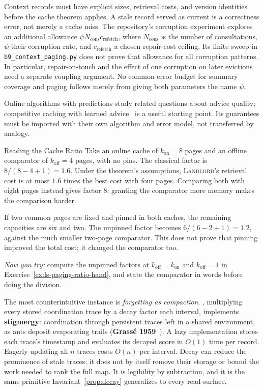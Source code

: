 \documentclass[11pt,a4paper]{article}
\theoremstyle{definition}
\theoremstyle{plain}
\begin{document}
\begin{pdboundary}
Context records must have explicit sizes, retrieval costs, and version identities before the cache theorem applies. A stale record served as current is a correctness error, not merely a cache miss. The repository's corruption experiment explores an additional allowance $\psi N_{\mathrm{cons}} c_{\mathrm{refetch}}$, where $N_{\mathrm{cons}}$ is the number of consultations, $\psi$ their corruption rate, and $c_{\mathrm{refetch}}$ a chosen repair-cost ceiling. Its finite sweep in \texttt{b9\_context\_paging.py} does not prove that allowance for all corruption patterns. In particular, repair-on-touch and the effect of one corruption on later evictions need a separate coupling argument. No common error budget for summary coverage and paging follows merely from giving both parameters the name $\psi$.

Online algorithms with predictions study related questions about advice quality; competitive caching with learned advice~ is a useful starting point. Its guarantees must be imported with their own algorithm and error model, not transferred by analogy.
\end{pdboundary}

\begin{pdexample}{Reading the Cache Ratio}
Take an online cache of $k_{\mathrm{on}}=8$ pages and an offline comparator of $k_{\mathrm{off}}=4$ pages, with no pins. The classical factor is $8/(8-4+1)=1.6$. Under the theorem's assumptions, \textsc{Landlord}'s retrieval cost is at most $1.6$ times the best cost with four pages. Comparing both with eight pages instead gives factor $8$: granting the comparator more memory makes the comparison harder.

If two common pages are fixed and pinned in both caches, the remaining capacities are six and two. The unpinned factor becomes $6/(6-2+1)=1.2$, against the much smaller two-page comparator. This does not prove that pinning improved the total cost; it changed the comparator too.

\emph{Now you try:} compute the unpinned factors at $k_{\mathrm{off}}=k_{\mathrm{on}}$ and $k_{\mathrm{off}}=1$ in Exercise~\ref{ex:ls-paging-ratio-hand}, and state the comparator in words before doing the division.
\end{pdexample}

The most counterintuitive instance is \emph{forgetting as compaction}.
, multiplying every stored coordination trace by a decay
factor each interval, implements \textbf{stigmergy}: coordination through
persistent traces left in a shared environment, as ants deposit evaporating
trails (\textbf{Grass\'e 1959}~). A lazy implementation stores each trace's timestamp and evaluates its decayed score in $O(1)$ time per record. Eagerly updating all $n$ traces costs $O(n)$ per interval. Decay can reduce the prominence of stale traces; it does not by itself remove their storage or bound the work needed to rank the full map. It is legibility by subtraction, and it is the same primitive
Invariant~\ref{prop:decay} generalizes to every read-surface.
\end{document}
